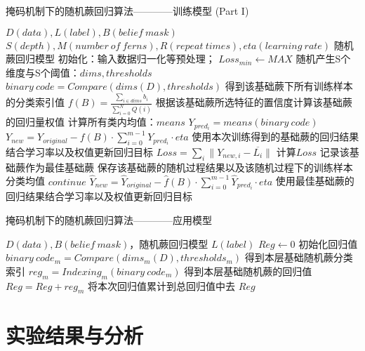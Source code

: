 \begin{algorithm}
\caption{掩码机制下的随机蕨回归算法————训练模型 (Part I)}
\begin{algorithmic}[1]
\Require $D(data), L(label), B(belief\ mask)$
\Require $S(depth), M(number\ of\ ferns), R(repeat\ times), eta(learning\ rate)$
\Ensure 随机蕨回归模型
\State 初始化：输入数据归一化等预处理；
	\State $Loss_{min}\leftarrow MAX$
		\State 随机产生S个维度与S个阈值：$dims, thresholds$
		\State $binary\ code=Compare(dims(D), thresholds)$
		\State \Comment 得到该基础蕨下所有训练样本的分类索引值
		\State $f(B)=\frac{\sum_{i\in dims} b_i}{\sum_{i=0}^{N} Q(i)}$
		\State \Comment 根据该基础蕨所选特征的置信度计算该基础蕨的回归量权值
		\State 计算所有类内均值：$means$
		\State $Y_{pred_i}=means(binary\ code)$
		\State $Y_{new}=Y_{original}-f(B)\cdot \sum_{i=0}^{m-1} Y_{pred_i}\cdot eta$
		\State \Comment 使用本次训练得到的基础蕨的回归结果结合学习率以及权值更新回归目标
		\State $Loss=\sum_i{\|Y_{new,i}-\overline{L_i}\|}$
		\State \Comment 计算$Loss$
			\State 记录该基础蕨作为最佳基础蕨
			\State 保存该基础蕨的随机过程结果以及该随机过程下的训练样本分类均值
		\Else 
			\State $continue$
		\EndIf
	\State $\hat{Y}_{new}=\hat{Y}_{original}-\hat{f}(B)\cdot \sum_{i=0}^{m-1} \hat{Y}_{pred_i}\cdot eta$
	\State \Comment 使用最佳基础蕨的回归结果结合学习率以及权值更新回归目标
	\EndFor
\EndFor
\end{algorithmic}
\end{algorithm}

\begin{algorithm}
\caption{掩码机制下的随机蕨回归算法————应用模型}
\begin{algorithmic}[1]
\Require $D(data), B(belief\ mask)$，随机蕨回归模型
\Ensure $L(label)$
\State $Reg\leftarrow 0$
\Comment 初始化回归值
	\State $binary\ code_m=Compare(dims_m(D), thresholds_m)$
	\Comment 得到本层基础随机蕨分类索引
	\State $reg_m=Indexing_m(binary\ code_m)$
	\Comment 得到本层基础随机蕨的回归值
	\State $Reg=Reg+reg_m$
	\Comment 将本次回归值累计到总回归值中去
\EndFor
\State \Return $Reg$
\end{algorithmic}
\end{algorithm}




\section{实验结果与分析} %




























